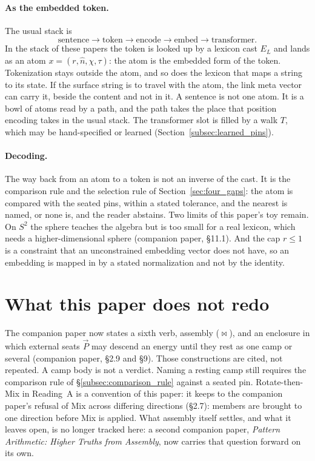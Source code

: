 \documentclass[12pt, a4paper]{article}
\begin{document}
\paragraph{As the embedded token.} The usual stack is
\[
\text{sentence}\to\text{token}\to\text{encode}\to\text{embed}\to\text{transformer}.
\]
In the stack of these papers the token is looked up by a lexicon cast $E_L$ and lands as an atom $x=(r,\hat n,\chi,\tau)$: the atom is the embedded form of the token. Tokenization stays outside the atom, and so does the lexicon that maps a string to its state. If the surface string is to travel with the atom, the link meta vector can carry it, beside the content and not in it. A sentence is not one atom. It is a bowl of atoms read by a path, and the path takes the place that position encoding takes in the usual stack. The transformer slot is filled by a walk $T$, which may be hand-specified or learned (Section~\ref{subsec:learned_pins}).

\paragraph{Decoding.} The way back from an atom to a token is not an inverse of the cast. It is the comparison rule and the selection rule of Section~\ref{sec:four_gaps}: the atom is compared with the seated pins, within a stated tolerance, and the nearest is named, or none is, and the reader abstains. Two limits of this paper's toy remain. On $S^2$ the sphere teaches the algebra but is too small for a real lexicon, which needs a higher-dimensional sphere (companion paper, \S11.1). And the cap $r\le 1$ is a constraint that an unconstrained embedding vector does not have, so an embedding is mapped in by a stated normalization and not by the identity.

\section{What this paper does not redo}
\label{sec:not_redo}

The companion paper now states a sixth verb, assembly ($\bowtie$),
and an enclosure in which external seats $\vec P$ may descend an
energy until they rest as one camp or several
(companion paper, \S2.9 and \S9). Those
constructions are cited, not repeated. A camp body is not a verdict.
Naming a resting camp still requires the comparison rule of
\S\ref{subsec:comparison_rule} against a seated pin. Rotate-then-Mix
in Reading~A is a convention of this paper: it keeps to the companion paper's refusal of Mix across differing directions (\S2.7): members are
brought to one direction before Mix is applied. What
assembly itself settles, and what it leaves open, is no longer
tracked here: a second companion paper, \emph{Pattern Arithmetic:
Higher Truths from Assembly}, now carries that question forward on
its own.
\end{document}
